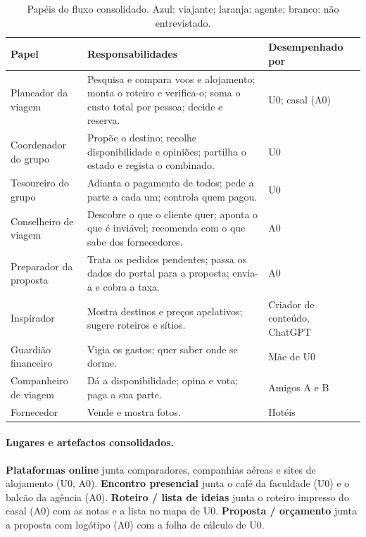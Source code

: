 \begin{table}[!htbp]
\centering\small
\begin{tabularx}{\textwidth}{@{}p{3.4cm}Lp{2.8cm}@{}}
\toprule
\textbf{Papel} & \textbf{Responsabilidades} & \textbf{Desempenhado por} \\
\midrule
{} Planeador da viagem & Pesquisa e compara voos e alojamento; monta o roteiro e verifica-o; soma o custo total por pessoa; decide e reserva. & U0; casal (A0) \\
 Coordenador do grupo & Propõe o destino; recolhe disponibilidade e opiniões; partilha o estado e regista o combinado. & U0 \\
 Tesoureiro do grupo & Adianta o pagamento de todos; pede a parte a cada um; controla quem pagou. & U0 \\
 Conselheiro de viagem & Descobre o que o cliente quer; aponta o que é inviável; recomenda com o que sabe dos fornecedores. & A0 \\
 Preparador da proposta & Trata os pedidos pendentes; passa os dados do portal para a proposta; envia-a e cobra a taxa. & A0 \\
Inspirador & Mostra destinos e preços apelativos; sugere roteiros e sítios. & Criador de conteúdo, ChatGPT \\
Guardião financeiro & Vigia os gastos; quer saber onde se dorme. & Mãe de U0 \\
Companheiro de viagem & Dá a disponibilidade; opina e vota; paga a sua parte. & Amigos A e B \\
Fornecedor & Vende e mostra fotos. & Hotéis \\
\bottomrule
\end{tabularx}
\caption{Papéis do fluxo consolidado. Azul: viajante; laranja: agente; branco: não entrevistado.}
\label{tab:papeis-cons}
\end{table}

\paragraph{Lugares e artefactos consolidados.} \textbf{Plataformas online} junta comparadores, companhias aéreas e sites de alojamento (U0, A0). \textbf{Encontro presencial} junta o café da faculdade (U0) e o balcão da agência (A0). \textbf{Roteiro / lista de ideias} junta o roteiro impresso do casal (A0) com as notas e a lista no mapa de U0. \textbf{Proposta / orçamento} junta a proposta com logótipo (A0) com a folha de cálculo de U0.

